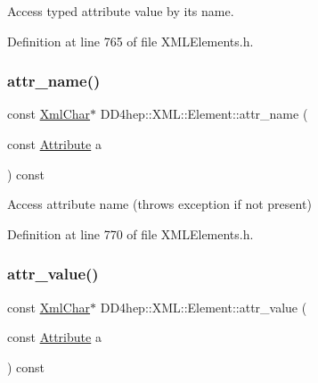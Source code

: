Access typed attribute value by it\textquotesingle{}s name. 



Definition at line 765 of file X\+M\+L\+Elements.\+h.

\hypertarget{class_d_d4hep_1_1_x_m_l_1_1_element_abf6fd43ca3f42b7e924613a6fdb2ddf6}{}\label{class_d_d4hep_1_1_x_m_l_1_1_element_abf6fd43ca3f42b7e924613a6fdb2ddf6} 
\subsubsection{\texorpdfstring{attr\+\_\+name()}{attr\_name()}}
{\footnotesize\ttfamily const \hyperlink{namespace_d_d4hep_1_1_x_m_l_a09e5d9cc86ed782f6826dfe0778c1815}{Xml\+Char}$\ast$ D\+D4hep\+::\+X\+M\+L\+::\+Element\+::attr\+\_\+name (\begin{DoxyParamCaption}\item[{const \hyperlink{namespace_d_d4hep_1_1_x_m_l_a5c19b7116be99d69b4b22d911357baaf}{Attribute}}]{a }\end{DoxyParamCaption}) const\hspace{0.3cm}{\ttfamily [inline]}}



Access attribute name (throws exception if not present) 



Definition at line 770 of file X\+M\+L\+Elements.\+h.

\hypertarget{class_d_d4hep_1_1_x_m_l_1_1_element_a3a9a3379d22086608836995cf35c3243}{}\label{class_d_d4hep_1_1_x_m_l_1_1_element_a3a9a3379d22086608836995cf35c3243} 
\subsubsection{\texorpdfstring{attr\+\_\+value()}{attr\_value()}}
{\footnotesize\ttfamily const \hyperlink{namespace_d_d4hep_1_1_x_m_l_a09e5d9cc86ed782f6826dfe0778c1815}{Xml\+Char}$\ast$ D\+D4hep\+::\+X\+M\+L\+::\+Element\+::attr\+\_\+value (\begin{DoxyParamCaption}\item[{const \hyperlink{namespace_d_d4hep_1_1_x_m_l_a5c19b7116be99d69b4b22d911357baaf}{Attribute}}]{a }\end{DoxyParamCaption}) const\hspace{0.3cm}{\ttfamily [inline]}}



